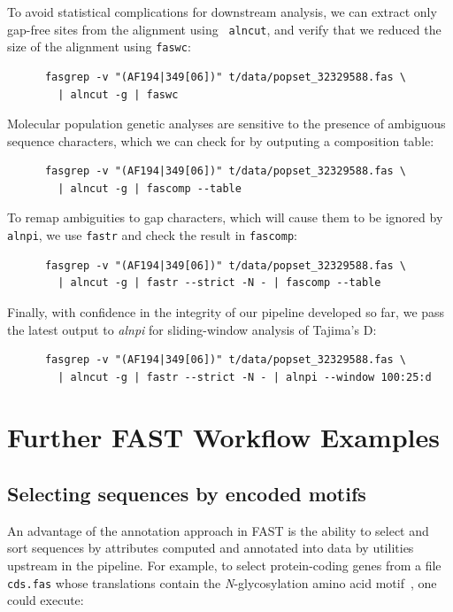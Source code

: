 \documentclass{frontiersSCNS} %
\begin{document}
\noindent To avoid statistical complications for downstream analysis,
we can extract only gap-free sites from the alignment using {\tt
  alncut}, and verify that we reduced the size of the alignment using
{\tt faswc}:

\begin{verbatim}
      fasgrep -v "(AF194|349[06])" t/data/popset_32329588.fas \
        | alncut -g | faswc
\end{verbatim}

\noindent Molecular population genetic analyses are sensitive to the
presence of ambiguous sequence characters, which we can check for by
outputing a composition table:
 
\begin{verbatim}
      fasgrep -v "(AF194|349[06])" t/data/popset_32329588.fas \ 
        | alncut -g | fascomp --table
\end{verbatim}

\noindent To remap ambiguities to gap characters, which will cause
them to be ignored by {\tt alnpi}, we use {\tt fastr} and check the
result in {\tt fascomp}:
 
\begin{verbatim}
      fasgrep -v "(AF194|349[06])" t/data/popset_32329588.fas \
        | alncut -g | fastr --strict -N - | fascomp --table
\end{verbatim}

\noindent Finally, with confidence in the integrity of our pipeline
developed so far, we pass the latest output to {\it alnpi} for
sliding-window analysis of Tajima's D:
 
\begin{verbatim}
      fasgrep -v "(AF194|349[06])" t/data/popset_32329588.fas \ 
        | alncut -g | fastr --strict -N - | alnpi --window 100:25:d
\end{verbatim}

\section{Further FAST Workflow Examples}

\subsection{Selecting sequences by encoded motifs }

An advantage of the annotation approach in FAST is the ability to
select and sort sequences by attributes computed and annotated into
data by utilities upstream in the pipeline. For example, to select
protein-coding genes from a file {\tt cds.fas} whose translations
contain the {\it N}-glycosylation amino acid
motif~\citep{KornfieldKornfield85}, one could execute:
\end{document}
